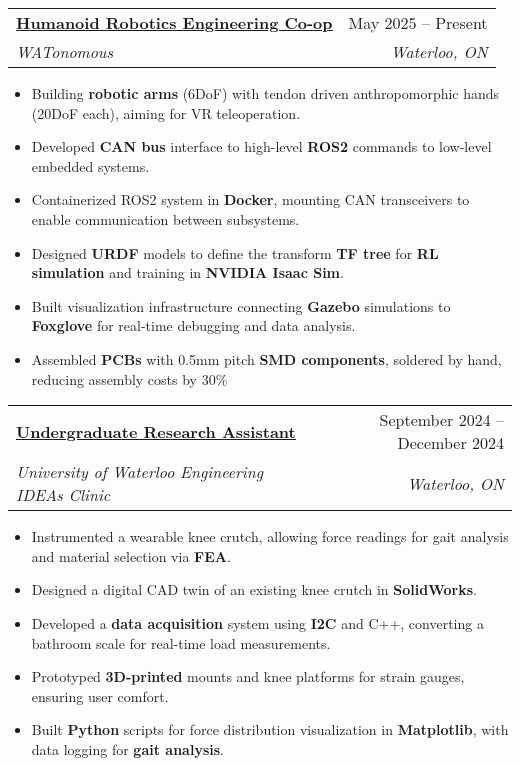 \documentclass[letterpaper]{article}
\makeatletter
\newcommand{\resumeItem}[1]{
  \item\small{
    {#1 \vspace{-2pt}}
  }
}
\newcommand{\resumeSubheading}[4]{
  \vspace{-2pt}\item
    \begin{tabular*}{0.97\textwidth}[t]{l@{\extracolsep{\fill}}r}
      \textbf{#1} & #2 \\
      \textit{\small#3} & \textit{\small #4} \\
    \end{tabular*}\vspace{-7pt}
}
\newcommand{\resumeItemListStart}{\begin{itemize}}
\newcommand{\resumeItemListEnd}{\end{itemize}\vspace{-5pt}}
\makeatother
\begin{document}
\resumeSubheading
  {\href{https://gavintranquilino.com/wato-humanoid/}{\underline{Humanoid Robotics Engineering Co-op}}}{May 2025 -- Present}
  {WATonomous}{Waterloo, ON}
  \resumeItemListStart
    \resumeItem{Building \textbf{robotic arms} (6DoF) with tendon driven anthropomorphic hands (20DoF each), aiming for VR teleoperation.}
    \resumeItem{Developed \textbf{CAN bus} interface to high-level \textbf{ROS2} commands to low-level embedded systems.}
    \resumeItem{Containerized ROS2 system in \textbf{Docker}, mounting CAN transceivers to enable communication between subsystems.}
    \resumeItem{Designed \textbf{URDF} models to define the transform \textbf{TF tree} for \textbf{RL simulation} and training in \textbf{NVIDIA Isaac Sim}.}
    \resumeItem{Built visualization infrastructure connecting \textbf{Gazebo} simulations to \textbf{Foxglove} for real-time debugging and data analysis.}
    \resumeItem{Assembled \textbf{PCBs} with 0.5mm pitch \textbf{SMD components}, soldered by hand, reducing assembly costs by 30\%}
  \resumeItemListEnd


\resumeSubheading
  {\href{https://www.gavintranquilino.com/ideas-clinic.html}{\underline{Undergraduate Research Assistant}}}{September 2024 -- December 2024}
  {University of Waterloo Engineering IDEAs Clinic}{Waterloo, ON}
  \resumeItemListStart
    \resumeItem{Instrumented a wearable knee crutch, allowing force readings for gait analysis and material selection via \textbf{FEA}.}
    \resumeItem{Designed a digital CAD twin of an existing knee crutch in \textbf{SolidWorks}.}
    \resumeItem{Developed a \textbf{data acquisition} system using \textbf{I2C} and C++, converting a bathroom scale for real-time load measurements.}
    \resumeItem{Prototyped \textbf{3D-printed} mounts and knee platforms for strain gauges, ensuring user comfort.}
    \resumeItem{Built \textbf{Python} scripts for force distribution visualization in \textbf{Matplotlib}, with data logging for \textbf{gait analysis}.}
  \resumeItemListEnd
\end{document}
